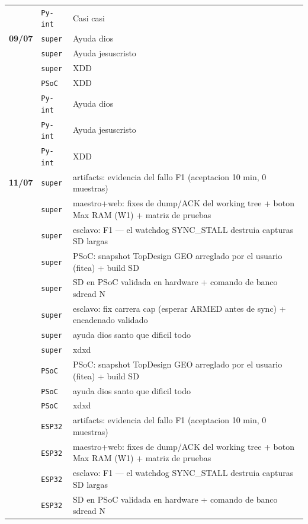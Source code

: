 \begin{longtable}{@{}p{1.7cm} p{1.5cm} p{12.2cm}@{}}
 & \texttt{\scriptsize Py-int} & Casi casi \\
\textbf{09/07} & \texttt{\scriptsize super} & Ayuda dios \\
 & \texttt{\scriptsize super} & Ayuda jesuscristo \\
 & \texttt{\scriptsize super} & XDD \\
 & \texttt{\scriptsize PSoC} & XDD \\
 & \texttt{\scriptsize Py-int} & Ayuda dios \\
 & \texttt{\scriptsize Py-int} & Ayuda jesuscristo \\
 & \texttt{\scriptsize Py-int} & XDD \\
\textbf{11/07} & \texttt{\scriptsize super} & artifacts: evidencia del fallo F1 (aceptacion 10 min, 0 muestras) \\
 & \texttt{\scriptsize super} & maestro+web: fixes de dump/ACK del working tree + boton Max RAM (W1) + matriz de pruebas \\
 & \texttt{\scriptsize super} & esclavo: F1 --- el watchdog SYNC\_STALL destruia capturas SD largas \\
 & \texttt{\scriptsize super} & PSoC: snapshot TopDesign GEO arreglado por el usuario (fitea) + build SD \\
 & \texttt{\scriptsize super} & SD en PSoC validada en hardware + comando de banco sdread N \\
 & \texttt{\scriptsize super} & esclavo: fix carrera cap (esperar ARMED antes de sync) + encadenado validado \\
 & \texttt{\scriptsize super} & ayuda dios santo que dificil todo \\
 & \texttt{\scriptsize super} & xdxd \\
 & \texttt{\scriptsize PSoC} & PSoC: snapshot TopDesign GEO arreglado por el usuario (fitea) + build SD \\
 & \texttt{\scriptsize PSoC} & ayuda dios santo que dificil todo \\
 & \texttt{\scriptsize PSoC} & xdxd \\
 & \texttt{\scriptsize ESP32} & artifacts: evidencia del fallo F1 (aceptacion 10 min, 0 muestras) \\
 & \texttt{\scriptsize ESP32} & maestro+web: fixes de dump/ACK del working tree + boton Max RAM (W1) + matriz de pruebas \\
 & \texttt{\scriptsize ESP32} & esclavo: F1 --- el watchdog SYNC\_STALL destruia capturas SD largas \\
 & \texttt{\scriptsize ESP32} & SD en PSoC validada en hardware + comando de banco sdread N \\

\end{longtable}
